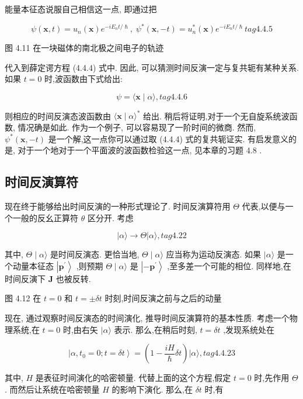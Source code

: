 能量本征态说服自己相信这一点, 即通过把

$$
\psi \left( {\mathbf{x}, t}\right) = {u}_{n}\left( \mathbf{x}\right) {e}^{-i{E}_{n}t/\hslash },\;{\psi }^{ * }\left( {\mathbf{x}, - t}\right) = {u}_{n}^{ * }\left( \mathbf{x}\right) {e}^{-i{E}_{n}t/\hslash } tag{4. 4.5}
$$



图 4.11 在一块磁体的南北极之间电子的轨迹

代入到薛定谔方程 (4.4.4) 式中. 因此, 可以猜测时间反演一定与复共轭有某种关系. 如果 $t = 0$ 时,波函数由下式给出:

$$
\psi = \langle \mathbf{x} \mid \alpha \rangle , tag{4. 4.6}
$$

则相应的时间反演态波函数由 $\langle \mathbf{x} \mid \alpha {\rangle }^{ * }$ 给出. 稍后将证明,对于一个无自旋系统波函数, 情况确是如此. 作为一个例子, 可以容易现了一阶时间的微商. 然而, ${\psi }^{ * }\left( {\mathbf{x}, - t}\right)$ 是一个解,这一点你可以通过取 (4.4.4) 式的复共轭证实. 有启发意义的是, 对于一个地对于一个平面波的波函数检验这一点, 见本章的习题 4.8 .

\subsection{时间反演算符}

现在终于能够给出时间反演的一种形式理论了. 时间反演算符用 $\Theta$ 代表,以便与一个一般的反幺正算符 $\theta$ 区分开. 考虑

$$
\left| {\alpha \rangle \rightarrow \Theta }\right| \alpha \rangle , tag{4. 2 2}
$$

其中, $\Theta \mid \alpha \rangle$ 是时间反演态. 更恰当地, $\Theta \mid \alpha \rangle$ 应当称为运动反演态. 如果 $|\alpha \rangle$ 是一个动量本征态 $\left| {\mathbf{p}}^{\prime }\right\rangle$ ,则预期 $\Theta \mid \alpha \rangle$ 是 $\left| {-{\mathbf{p}}^{\prime }}\right\rangle$ ,至多差一个可能的相位. 同样地,在时间反演下 $\mathbf{J}$ 也被反转.



图 4.12 在 $t = 0$ 和 $t = \pm {\delta t}$ 时刻,时间反演之前与之后的动量

现在, 通过观察时间反演态的时间演化, 推导时间反演算符的基本性质. 考虑一个物理系统,在 $t = 0$ 时,由右矢 $|\alpha \rangle$ 表示. 那么,在稍后时刻, $t = {\delta t}$ ,发现系统处在

$$
\left| {\alpha ,{t}_{0} = 0;t = {\delta t}}\right\rangle = \left( {1 - \frac{iH}{\hslash }{\delta t}}\right) |\alpha \rangle , tag{4. 4.23}
$$

其中, $H$ 是表征时间演化的哈密顿量. 代替上面的这个方程,假定 $t = 0$ 时,先作用 $\Theta$ . 而然后让系统在哈密顿量 $H$ 的影响下演化. 那么,在 ${\delta t}$ 时,有

